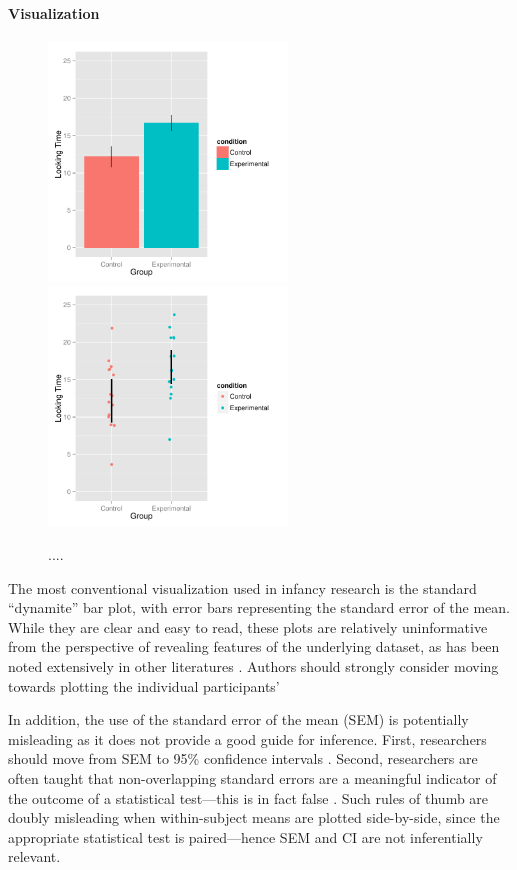 \documentclass[man,noapacite]{apa2}
\begin{document}
\paragraph{Visualization}


\begin{figure}[t]
\centering
  \includegraphics[width=2.5in]{../plots/bars.pdf}
  \includegraphics[width=2.5in]{../plots/scatter.pdf}
	\caption{\label{fig:plots}....}
\end{figure}

The most conventional visualization used in infancy research is the standard ``dynamite'' bar plot, with error bars representing the standard error of the mean. While they are clear and easy to read, these plots are relatively uninformative from the perspective of revealing features of the underlying dataset, as has been noted extensively in other literatures \cite{plosbio}. Authors should strongly consider moving towards plotting the individual participants' 

In addition, the use of the standard error of the mean (SEM) is potentially misleading as it does not provide a good guide for inference. First, researchers should move from SEM to 95\% confidence intervals \cite{cumming2013}. Second, researchers are often taught that non-overlapping standard errors are a meaningful indicator of the outcome of a statistical test---this is in fact false \cite{cumming2006}. Such rules of thumb are doubly misleading when within-subject means are plotted side-by-side, since the appropriate statistical test is paired---hence SEM and CI are not inferentially relevant. 
\end{document}
